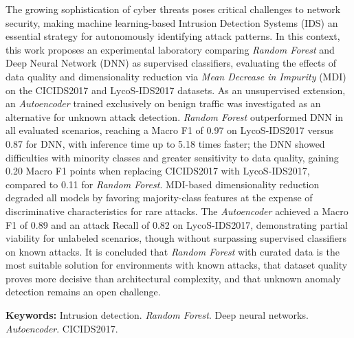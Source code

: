 The growing sophistication of cyber threats poses critical challenges to network security, making machine learning-based Intrusion Detection Systems (IDS) an essential strategy for autonomously identifying attack patterns. In this context, this work proposes an experimental laboratory comparing \textit{Random Forest} and Deep Neural Network (DNN) as supervised classifiers, evaluating the effects of data quality and dimensionality reduction via \textit{Mean Decrease in Impurity} (MDI) on the CICIDS2017 and LycoS-IDS2017 datasets. As an unsupervised extension, an \textit{Autoencoder} trained exclusively on benign traffic was investigated as an alternative for unknown attack detection. \textit{Random Forest} outperformed DNN in all evaluated scenarios, reaching a Macro F1 of 0.97 on LycoS-IDS2017 versus 0.87 for DNN, with inference time up to 5.18 times faster; the DNN showed difficulties with minority classes and greater sensitivity to data quality, gaining 0.20 Macro F1 points when replacing CICIDS2017 with LycoS-IDS2017, compared to 0.11 for \textit{Random Forest}. MDI-based dimensionality reduction degraded all models by favoring majority-class features at the expense of discriminative characteristics for rare attacks. The \textit{Autoencoder} achieved a Macro F1 of 0.89 and an attack Recall of 0.82 on LycoS-IDS2017, demonstrating partial viability for unlabeled scenarios, though without surpassing supervised classifiers on known attacks. It is concluded that \textit{Random Forest} with curated data is the most suitable solution for environments with known attacks, that dataset quality proves more decisive than architectural complexity, and that unknown anomaly detection remains an open challenge.

\noindent\textbf{Keywords:} Intrusion detection. \textit{Random Forest}. Deep neural networks. \textit{Autoencoder}. CICIDS2017.

